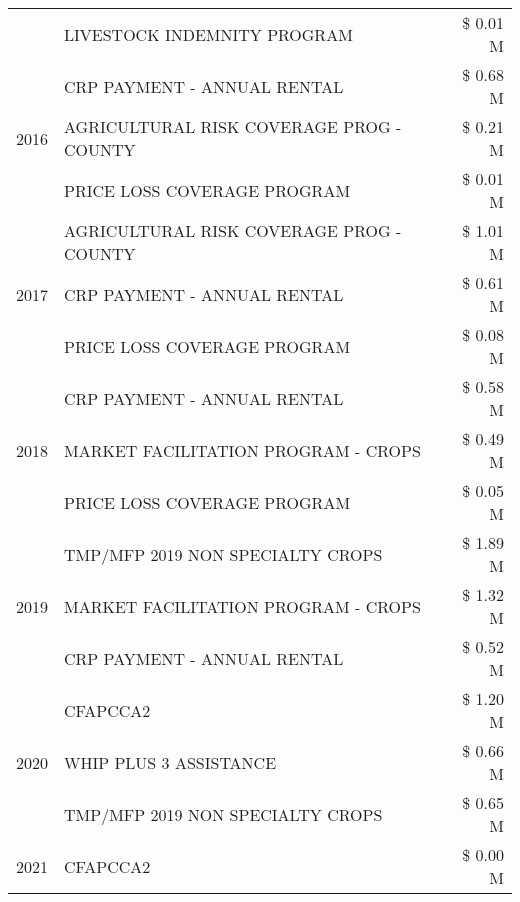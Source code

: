 \begin{tabular}{llr}
 & LIVESTOCK INDEMNITY PROGRAM & \$ 0.01 M \\
\cline{1-3}
\multirow[t]{3}{*}{2016} & CRP PAYMENT - ANNUAL RENTAL & \$ 0.68 M \\
 & AGRICULTURAL RISK COVERAGE PROG - COUNTY & \$ 0.21 M \\
 & PRICE LOSS COVERAGE PROGRAM & \$ 0.01 M \\
\cline{1-3}
\multirow[t]{3}{*}{2017} & AGRICULTURAL RISK COVERAGE PROG - COUNTY & \$ 1.01 M \\
 & CRP PAYMENT - ANNUAL RENTAL & \$ 0.61 M \\
 & PRICE LOSS COVERAGE PROGRAM & \$ 0.08 M \\
\cline{1-3}
\multirow[t]{3}{*}{2018} & CRP PAYMENT - ANNUAL RENTAL & \$ 0.58 M \\
 & MARKET FACILITATION PROGRAM - CROPS & \$ 0.49 M \\
 & PRICE LOSS COVERAGE PROGRAM & \$ 0.05 M \\
\cline{1-3}
\multirow[t]{3}{*}{2019} & TMP/MFP 2019 NON SPECIALTY CROPS & \$ 1.89 M \\
 & MARKET FACILITATION PROGRAM - CROPS & \$ 1.32 M \\
 & CRP PAYMENT - ANNUAL RENTAL & \$ 0.52 M \\
\cline{1-3}
\multirow[t]{3}{*}{2020} & CFAPCCA2 & \$ 1.20 M \\
 & WHIP PLUS 3 ASSISTANCE & \$ 0.66 M \\
 & TMP/MFP 2019 NON SPECIALTY CROPS & \$ 0.65 M \\
\cline{1-3}
2021 & CFAPCCA2 & \$ 0.00 M \\
\cline{1-3}
\bottomrule
\end{tabular}
